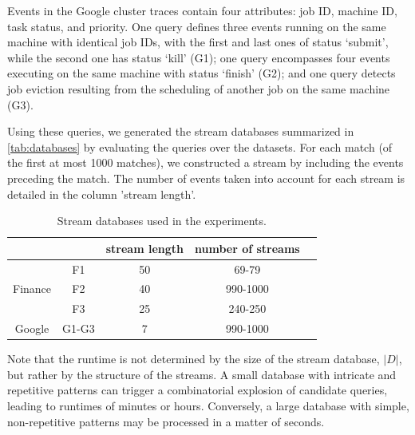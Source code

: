 Events in the Google cluster traces contain four attributes:
job ID, machine ID, task status, and priority. One query
defines three events running on the same machine with identical job IDs,
with the first and last ones of status `submit', while the
second one has
status `kill' (G1); one query encompasses four events
executing on the same
machine with status `finish' (G2); and one query detects job eviction
resulting from the scheduling of another job on the same
machine (G3).

Using these queries, we generated the stream databases summarized in
\autoref{tab:databases} by evaluating the queries over the
datasets. For each match (of the first at most 1000 matches), we constructed a
stream by including the events preceding the match.
The number of events taken into account for each stream
 is detailed in the column 'stream length'.


\begin{table}[h]
	\caption{Stream databases used in the experiments.}
	\label{tab:databases}
	\small
	\centering
	\begin{tabular}{c c c c c }
		\toprule
		\multicolumn{2}{c}{}          & stream
			length& number
			of
			streams\\%
		\midrule
		\multirow{3}{*}{Finance} & F1 & 50                    &
		69-79                                                           \\
		& F2 & 40
		& 990-1000                                                       \\
		& F3 & 25
		& 240-250                                                           \\
		\multirow{1}{*}{Google}  & G1-G3 & 7              &
		990-1000                                                         \\
		\bottomrule
	\end{tabular}
\end{table}

Note that the runtime is not determined by the size of the stream database,
$|D|$, but rather by the structure of the streams. A small database with intricate and repetitive patterns can trigger
a combinatorial explosion of candidate queries, leading to runtimes of minutes or hours.
Conversely, a large database with simple, non-repetitive patterns may be processed in a matter of seconds.

